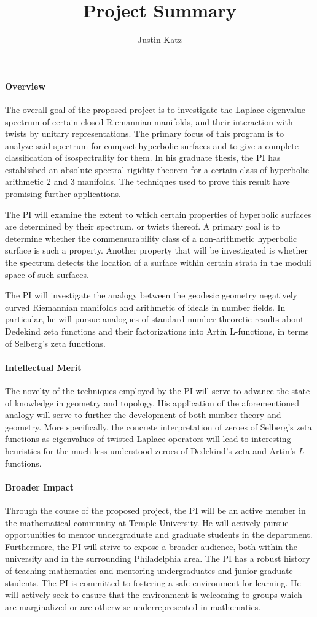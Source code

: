 \documentclass[12pt]{article}
\title{Project Summary}
\author{Justin Katz \vspace{-1 em}}
\date{	}
\begin{document}
 
	\maketitle

\paragraph{Overview} The overall goal of the proposed project is to investigate the Laplace eigenvalue spectrum of certain closed Riemannian manifolds, and their interaction with twists by unitary representations. The primary focus of this program is to analyze said spectrum for compact hyperbolic surfaces and to give a complete classification of isospectrality for them. In his graduate thesis, the PI has established an absolute spectral rigidity theorem for a certain class of hyperbolic arithmetic $2$ and $3$ manifolds. The techniques used to prove this result have promising further applications.

The PI will examine the  extent to which certain properties of hyperbolic surfaces are determined by their spectrum, or twists thereof. A primary goal is to determine whether the commensurability class of a non-arithmetic hyperbolic surface is such a property. Another property that will be investigated is whether the spectrum detects the location of a surface within certain strata in the moduli space of such surfaces. 

The PI will investigate the analogy between the geodesic geometry  negatively curved Riemannian manifolds and arithmetic of ideals in number fields. In particular, he will pursue analogues of standard number theoretic results about Dedekind zeta functions and their factorizations into Artin L-functions, in terms of Selberg's zeta functions. 
\paragraph{Intellectual Merit}
The novelty of the techniques employed by the PI will serve to advance the state of knowledge in geometry and topology. His application of the aforementioned analogy will serve to further the development of both number theory and geometry. More specifically, the concrete interpretation of zeroes of Selberg's zeta functions as eigenvalues of twisted Laplace operators will lead to interesting heuristics for the much less understood zeroes of Dedekind's zeta and Artin's $L$ functions. 
\paragraph{Broader Impact}
Through the course of the proposed project, the PI will be an active member in the mathematical community at Temple University. He will actively pursue opportunities to mentor undergraduate and graduate students in the department. Furthermore, the PI will strive to expose a broader audience, both within the university and in the surrounding Philadelphia area. The PI has a robust history of teaching mathematics and mentoring undergraduates and junior graduate students. The PI is committed to fostering a safe environment for learning. He will actively seek to ensure that the environment is welcoming to groups which are marginalized or are otherwise underrepresented in mathematics. 
\end{document}
